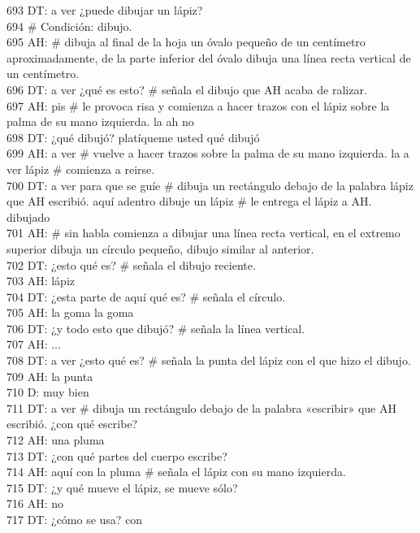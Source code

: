 693 DT: a ver ¿puede dibujar un lápiz?\\
694 \# Condición: dibujo.\\
695 AH: \# dibuja al final de la hoja un óvalo pequeño de un centímetro aproximadamente, de la parte inferior del óvalo dibuja una línea recta vertical de un centímetro.\\
696 DT: a ver ¿qué es esto? \# señala el dibujo que AH acaba de ralizar.\\
697 AH: pis \# le provoca risa y comienza a hacer trazos con el lápiz sobre la palma de su mano izquierda. la ah no\\
698 DT: ¿qué dibujó? platíqueme usted qué dibujó\\
699 AH: a ver \# vuelve a hacer trazos sobre la palma de su mano izquierda. la a ver lápiz \# comienza a reirse. \\
700 DT: a ver para que se guíe \# dibuja un rectángulo debajo de la palabra lápiz que AH escribió. aquí adentro dibuje un lápiz \# le entrega el lápiz a AH. dibujado\\
701 AH: \# sin habla comienza a dibujar una línea recta vertical, en el extremo superior dibuja un círculo pequeño, dibujo similar al anterior.\\
702 DT: ¿esto qué es? \# señala el dibujo reciente.\\
703 AH: lápiz\\
704 DT: ¿esta parte de aquí qué es? \# señala el círculo.\\
705 AH: la goma la goma\\
706 DT: ¿y todo esto que dibujó? \# señala la línea vertical.\\
707 AH: ...\\
708 DT: a ver ¿esto qué es? \# señala la punta del lápiz con el que hizo el dibujo.\\
709 AH: la punta\\
710 D: muy bien\\
711 DT: a ver \# dibuja un rectángulo debajo de la palabra «escribir» que AH escribió. ¿con qué escribe?\\
712 AH: una pluma\\
713 DT: ¿con qué partes del cuerpo escribe?\\
714 AH: aquí con la pluma \# señala el lápiz con su mano izquierda.\\
715 DT: ¿y qué mueve el lápiz, se mueve sólo?\\
716 AH: no\\
717 DT: ¿cómo se usa? con\\
